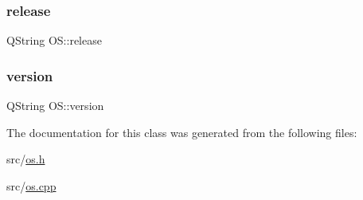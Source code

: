 \subsubsection{\texorpdfstring{release}{release}}
{\footnotesize\ttfamily Q\+String O\+S\+::release\hspace{0.3cm}{\ttfamily [read]}}

\mbox{\label{classOS_af9d3ad8c99dd34d874634eae3163dcc3}} 
\subsubsection{\texorpdfstring{version}{version}}
{\footnotesize\ttfamily Q\+String O\+S\+::version\hspace{0.3cm}{\ttfamily [read]}}



The documentation for this class was generated from the following files\+:\begin{DoxyCompactItemize}
\item 
src/\mbox{\hyperlink{os_8h}{os.\+h}}\item 
src/\mbox{\hyperlink{os_8cpp}{os.\+cpp}}\end{DoxyCompactItemize}
